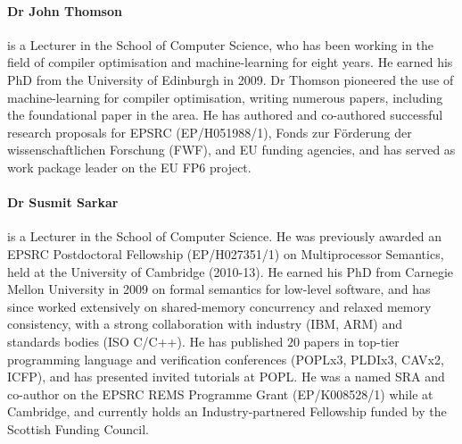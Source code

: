 \documentclass[a4paper,11pt]{article}
\begin{document}
\paragraph{Dr John Thomson}   is a Lecturer in the School of Computer Science, who has been working in the field of compiler optimisation
and machine-learning for eight years. He earned his PhD from the University of Edinburgh
in 2009. %
Dr Thomson pioneered the use of machine-learning for compiler optimisation, writing numerous papers,
including the foundational paper in the area. %
He has authored and co-authored successful research proposals for EPSRC (EP/H051988/1), Fonds zur F\"orderung der wissenschaftlichen Forschung (FWF), and EU funding agencies, and has served as work package leader on the EU FP6 \milepost project.

\paragraph{Dr Susmit Sarkar}  
is a Lecturer in the
School of Computer Science. He was previously awarded an EPSRC
Postdoctoral Fellowship (EP/H027351/1) on Multiprocessor Semantics,  held at the University of
Cambridge (2010-13). He earned his PhD from
Carnegie Mellon University in 2009 on formal semantics for low-level
software, and has since worked extensively on shared-memory
concurrency and relaxed memory consistency, with a strong
collaboration with industry (IBM, ARM) and standards bodies (ISO
C/C++). He has published $20$ papers in top-tier programming language
and verification conferences (POPLx3, PLDIx3, CAVx2, ICFP), and has
presented invited tutorials at POPL. He was a named SRA and co-author
on the EPSRC REMS Programme Grant (EP/K008528/1) while at Cambridge,
and currently holds an Industry-partnered Fellowship funded by the Scottish
Funding Council.
\end{document}
